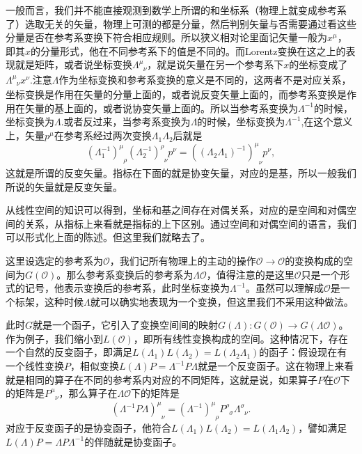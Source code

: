 一般而言，我们并不能直接观测到数学上所谓的和坐标系（物理上就变成参考系了）选取无关的矢量，物理上可测的都是分量，然后判别矢量与否需要通过看这些分量是否在参考系变换下符合相应规则。所以狭义相对论里面记矢量一般为$x^\mu$，即其$x$的分量形式，他在不同参考系下的值是不同的。而Lorentz变换在这之上的表现就是矩阵，或者说坐标变换$\Lambda^\mu_{\phantom{\mu}\nu}$，就是说矢量在另一个参考系下$x$的坐标变成了$\Lambda^\mu_{\phantom{\mu}\nu}x^\nu$.注意$\Lambda$作为坐标变换和参考系变换的意义是不同的，这两者不是对应关系，坐标变换是作用在矢量的分量上面的，或者说反变矢量上面的，而参考系变换是作用在矢量的基上面的，或者说协变矢量上面的。所以当参考系变换为$\Lambda^{-1}$的时候，坐标变换为$\Lambda$.或者反过来，当参考系变换为$\Lambda$的时候，坐标变换为$\Lambda^{-1}$,在这个意义上，矢量$p^\mu$在参考系经过两次变换$\Lambda_1\Lambda_2$后就是
\[
(\Lambda_1^{-1})^\mu_{\phantom{\mu}\rho}(\Lambda_2^{-1})^\rho_{\phantom{\rho}\nu}p^\nu=((\Lambda_2\Lambda_1)^{-1})^\mu_{\phantom{\mu}\nu}p^\nu,
\]
这就是所谓的反变矢量。指标在下面的就是协变矢量，对应的是基，所以一般我们所说的矢量就是反变矢量。

从线性空间的知识可以得到，坐标和基之间存在对偶关系，对应的是空间和对偶空间的关系，从指标上来看就是指标的上下区别。通过空间和对偶空间的语言，我们可以形式化上面的陈述。但这里我们就略去了。

这里设选定的参考系为$\mathcal{O}$，我们记所有物理上的主动的操作$\mathcal{O}\to \mathcal{O}$的变换构成的空间为$G(\mathcal{O})$。那么参考系变换后的参考系为$\Lambda \mathcal{O}$，值得注意的是这里$\mathcal{O}$只是一个形式的记号，他表示变换后的参考系，此时坐标变换为$\Lambda^{-1}$。虽然可以理解成$\mathcal{O}$是一个标架，这种时候$\Lambda$就可以确实地表现为一个变换，但这里我们不采用这种做法。

此时$G$就是一个函子，它引入了变换空间间的映射$G(\Lambda):G(\mathcal{O})\to G(\Lambda\mathcal{O})$。作为例子，我们缩小到$L(\mathcal{O})$，即所有线性变换构成的空间。这种情况下，存在一个自然的反变函子，即满足$L(\Lambda_1)L(\Lambda_2)=L(\Lambda_2 \Lambda_1)$的函子：假设现在有一个线性变换$P$，相似变换$L(\Lambda)P=\Lambda^{-1} P \Lambda$就是一个反变函子。这在物理上来看就是相同的算子在不同的参考系内对应的不同矩阵，这就是说，如果算子$P$在$\mathcal{O}$下的矩阵是$P^\mu_{\phantom{\mu}\nu}$，那么算子在$\Lambda\mathcal{O}$下的矩阵是
\[
(\Lambda^{-1} P\Lambda)^\mu_{\phantom{\mu}\nu}=(\Lambda^{-1})^\mu_{\phantom{\mu}\rho}P^\rho_{\phantom{\rho}\sigma}\Lambda^\sigma_{\phantom{\sigma}\nu}.
\]
对应于反变函子的是协变函子，他符合$L(\Lambda_1)L(\Lambda_2)=L(\Lambda_1 \Lambda_2)$，譬如满足$L(\Lambda)P=\Lambda P \Lambda^{-1}$的伴随就是协变函子。

